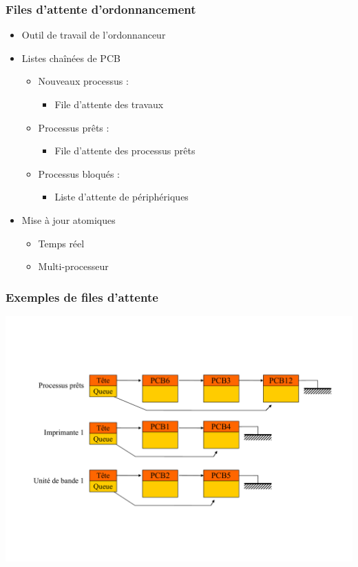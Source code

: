 \begin{frame}
 \frametitle{Files d’attente d’ordonnancement}
 \begin{itemize}
 \item Outil de travail de l'ordonnanceur
 \item Listes chaînées de PCB
 \begin{itemize}
 \item Nouveaux processus :
 \begin{itemize}
 \item File d’attente des travaux
 \end{itemize}
 \item Processus prêts :
 \begin{itemize}
 \item File d’attente des processus prêts
 \end{itemize}
 \item Processus bloqués :
 \begin{itemize}
 \item Liste d’attente de périphériques
 \end{itemize}
 \end{itemize}
 \item Mise à jour atomiques
\begin{itemize}
 \item Temps réel
 \item Multi-processeur
 \end{itemize}
 \end{itemize}
\end{frame}

\begin{frame}
 \frametitle{Exemples de files d’attente}
 \includegraphics[width=\textwidth]{../illustration/exemple_file_attente.pdf}
\end{frame}


